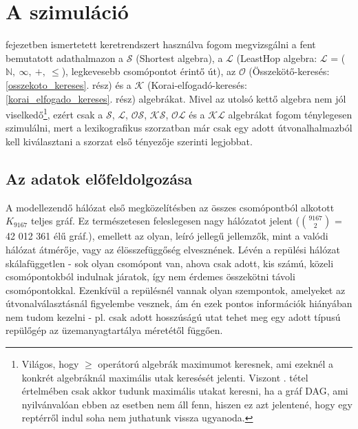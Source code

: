   \section{A szimuláció}
   fejezetben ismertetett keretrendszert használva fogom megvizsgálni a fent bemutatott adathalmazon a $\mathcal{S}$ (Shortest algebra), a $\mathcal{L}$ (LeastHop algebra: $\mathcal{L}$ = ($\mathbb{N},~\infty,~+,~\leq$), legkevesebb csomópontot érintő út), az $\mathcal{O}$ (Összekötő-keresés: \ref{osszekoto_kereses}. rész) és a $\mathcal{K}$ (Korai-elfogadó-keresés: \ref{korai_elfogado_kereses}. rész) algebrákat. Mivel az utolsó kettő algebra nem jól viselkedő\footnote{Világos, hogy $\geq$ operátorú algebrák maximumot keresnek, ami ezeknél a konkrét algebráknál maximális utak keresését jelenti. Viszont . tétel értelmében csak akkor tudunk maximális utakat keresni, ha a gráf DAG, ami nyilvánvalóan ebben az esetben nem áll fenn, hiszen ez azt jelentené, hogy egy reptérről indul soha nem juthatunk vissza ugyanoda.}, ezért csak a $\mathcal{S}$, $\mathcal{L}$, $\mathcal{OS}$, $\mathcal{KS}$, $\mathcal{OL}$ és a $\mathcal{KL}$ algebrákat fogom ténylegesen szimulálni, mert a lexikografikus szorzatban már csak egy adott útvonalhalmazból kell kiválasztani a szorzat első tényezője szerinti legjobbat.
    \subsection{Az adatok előfeldolgozása}
    A modellezendő hálózat első megközelítésben az összes csomópontból alkotott $K_{9167}$ teljes gráf. Ez természetesen feleslegesen nagy hálózatot jelent ($9167 \choose 2$ = 42 012 361 élű gráf.), emellett az olyan, leíró jellegű jellemzők, mint a valódi hálózat átmérője, vagy az élösszefüggőség elvesznének. Lévén a repülési hálózat skálafüggetlen - sok olyan csomópont van, ahova csak adott, kis számú, közeli csomópontokból indulnak járatok, így nem érdemes összekötni távoli csomópontokkal. Ezenkívül a repülésnél vannak olyan szempontok, amelyeket az útvonalválasztásnál figyelembe vesznek, ám én ezek pontos információk hiányában nem tudom kezelni - pl. csak adott hosszúságú utat tehet meg egy adott típusú repülőgép az üzemanyagtartálya méretétől függően.\\

